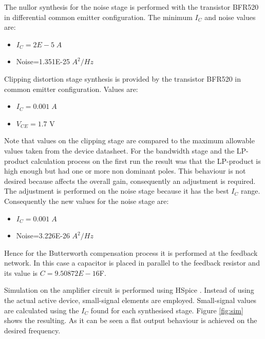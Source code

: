 \documentclass[twocolumn]{IEEEtran}
\begin{document}
The nullor synthesis for the noise stage is performed with the transistor BFR520 \cite{bfr520} in differential common emitter configuration. The minimum $I_C$ and noise values are: 

\begin{itemize}
\item $I_C=2E-5\;A$
\item Noise=1.351E-25 $A^2/Hz$
\end{itemize}

Clipping distortion stage synthesis is provided by the transistor BFR520 in common emitter configuration. Values are:

\begin{itemize}
\item $I_C=0.001\;A$
\item $V_{CE}=1.7$ V
\end{itemize}

Note that values on the clipping stage are compared to the maximum allowable values taken from the device datasheet. For the bandwidth stage and the LP-product calculation process on the first run the result was that the LP-product is high enough but had one or more non dominant poles. This behaviour is not desired because affects the overall gain, consequently an adjustment is required. The adjustment is performed on the noise stage because it has the best $I_C$ range. Consequently the new values for the noise stage are:

\begin{itemize}
\item $I_C=0.001\;A$
\item Noise=3.226E-26 $A^2/Hz$
\end{itemize}

Hence for the Butterworth compensation process it is performed at the feedback network. In this case a capacitor is placed in parallel to the feedback resistor and its value is $C=9.50872E-16$F.

Simulation on the amplifier circuit is performed using HSpice \cite{hspice}. Instead of using the actual active device, \mbox{small-signal} elements are employed. Small-signal values are calculated using the $I_C$ found for each synthesised stage. Figure \ref{fig:sim} shows the resulting. As it can be seen a flat output behaviour is achieved on the desired frequency.
\end{document}
